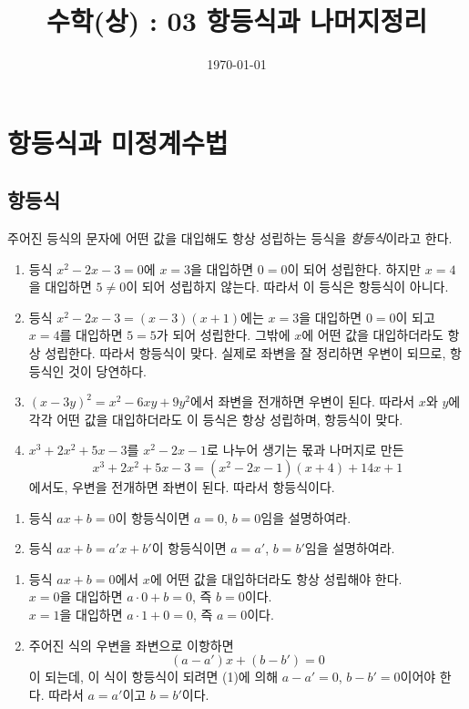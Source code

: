 \documentclass{oblivoir}
\begin{document}
\title{수학(상) : 03 항등식과 나머지정리}
\author{}
\date{\today}
\maketitle
\tableofcontents
\newpage

\section{항등식과 미정계수법}

\subsection{항등식}
\begin{mdframed}
%
주어진 등식의 문자에 어떤 값을 대입해도 항상 성립하는 등식을 \emph{항등식}이라고 한다.
\end{mdframed}

%
\exam{}
\begin{enumerate}[(1)]
\item
등식 \(x^2-2x-3=0\)에 \(x=3\)을 대입하면 \(0=0\)이 되어 성립한다.
하지만 \(x=4\)을 대입하면 \(5\neq0\)이 되어 성립하지 않는다.
따라서 이 등식은 항등식이 아니다.
\item
등식 \(x^2-2x-3=(x-3)(x+1)\)에는 \(x=3\)을 대입하면 \(0=0\)이 되고 \(x=4\)를 대입하면 \(5=5\)가 되어 성립한다.
그밖에 \(x\)에 어떤 값을 대입하더라도 항상 성립한다.
따라서 항등식이 맞다.
실제로 좌변을 잘 정리하면 우변이 되므로, 항등식인 것이 당연하다.
\item
\((x-3y)^2=x^2-6xy+9y^2\)에서 좌변을 전개하면 우변이 된다.
따라서 \(x\)와 \(y\)에 각각 어떤 값을 대입하더라도 이 등식은 항상 성립하며, 항등식이 맞다.
\item
\(x^3+2x^2+5x-3\)를 \(x^2-2x-1\)로 나누어 생기는 몫과 나머지로 만든 
\[x^3+2x^2+5x-3=(x^2-2x-1)(x+4)+14x+1\]
에서도, 우변을 전개하면 좌변이 된다.
따라서 항등식이다.
\end{enumerate}

\clearpage
%
\exam{}
\begin{enumerate}[(1)]
\item
등식 \(ax+b=0\)이 항등식이면 \(a=0\), \(b=0\)임을 설명하여라.
\item
등식 \(ax+b=a'x+b'\)이 항등식이면 \(a=a'\), \(b=b'\)임을 설명하여라.
\end{enumerate}

\begin{mdframed}
\begin{enumerate}[(1)]
\item
등식 \(ax+b=0\)에서 \(x\)에 어떤 값을 대입하더라도 항상 성립해야 한다.\\
\(x=0\)을 대입하면 \(a\cdot0+b=0\), 즉 \(b=0\)이다.\\
\(x=1\)을 대입하면 \(a\cdot1+0=0\), 즉 \(a=0\)이다.
\item
주어진 식의 우변을 좌변으로 이항하면 \[(a-a')x+(b-b')=0\]이 되는데, 이 식이 항등식이 되려면 (1)에 의해 \(a-a'=0\), \(b-b'=0\)이어야 한다.
따라서 \(a=a'\)이고 \(b=b'\)이다.
\end{enumerate}
\end{mdframed}
\end{document}
